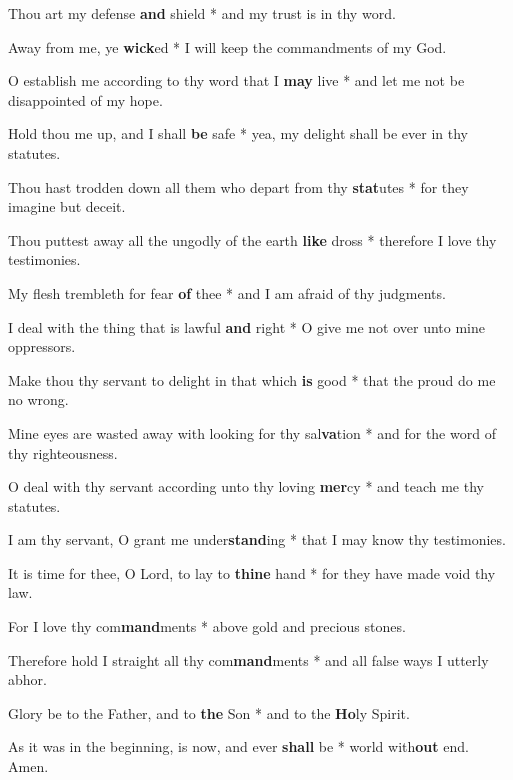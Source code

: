 \begin{multicols}{2}
	Thou art my defense \textbf{and} shield * and my trust is in thy word.
	
	Away from me, ye \textbf{wick}ed * I will keep the commandments of my God.
	
	O establish me according to thy word that I \textbf{may} live * and let me not be disappointed of my hope.
	
	Hold thou me up, and I shall \textbf{be} safe * yea, my delight shall be ever in thy statutes.
	
	Thou hast trodden down all them who depart from thy \textbf{stat}utes * for they imagine but deceit.
	
	Thou puttest away all the ungodly of the earth \textbf{like} dross * therefore I love thy testimonies.
	
	My flesh trembleth for fear \textbf{of} thee * and I am afraid of thy judgments.
	
	I deal with the thing that is lawful \textbf{and} right * O give me not over unto mine oppressors.
	
	Make thou thy servant to delight in that which \textbf{is} good * that the proud do me no wrong.
	
	Mine eyes are wasted away with looking for thy sal\textbf{va}tion * and for the word of thy righteousness.
	
	O deal with thy servant according unto thy loving \textbf{mer}cy * and teach me thy statutes.
	
	I am thy servant, O grant me under\textbf{stand}ing * that I may know thy testimonies.
	
	It is time for thee, O Lord, to lay to \textbf{thine} hand * for they have made void thy law.
	
	For I love thy com\textbf{mand}ments * above gold and precious stones.
	
	Therefore hold I straight all thy com\textbf{mand}ments * and all false ways I utterly abhor. 
	
	Glory be to the Father, and to \textbf{the} Son * and to the \textbf{Ho}ly Spirit.
	
	As it was in the beginning, is now, and ever \textbf{shall} be * world with\textbf{out} end. Amen.
\end{multicols}